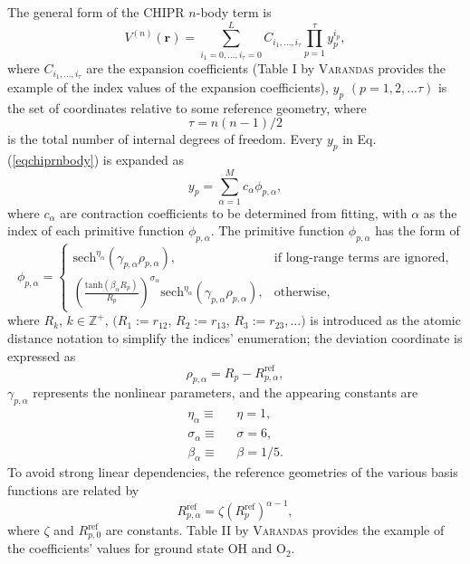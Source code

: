 \documentclass[12pt]{article}
\def\D{\displaystyle}
\begin{document}
The general form of the CHIPR $n$-body term is
\begin{equation}
    V^{(n)}(\mathbf{r}) = \sum^L_{i_1=0,...,i_\tau=0}C_{i_1,...,i_\tau}\prod^\tau_{p=1} y_p^{i_p},
\label{eqchiprnbody}
\end{equation}
where $C_{i_1,...,i_\tau}$ are the expansion coefficients (Table I by \textsc{Varandas} \cite{idx8} provides the example of the index values of the expansion coefficients), $y_p$ $(p=1,2,...\tau)$ is the set of coordinates relative to some reference geometry, where
\begin{equation}
    \tau = n(n-1)/2
\end{equation}
is the total number of internal degrees of freedom. Every $y_p$ in Eq.(\ref{eqchiprnbody}) is expanded as
\begin{equation}
    y_p = \sum^M_{\alpha=1}c_{\alpha}\phi_{p,\alpha},
\label{eqchiprcoor}
\end{equation}
where $c_\alpha$ are contraction coefficients to be determined from fitting, with $\alpha$ as the index of each primitive function 
$\phi_{p,\alpha}$. The primitive function $\phi_{p,\alpha}$ has the form of
\begin{equation}
    \phi_{p,\alpha} =
    \begin{cases}
        \text{sech}^{\eta_\alpha}(\gamma_{p,\alpha}\rho_{p,\alpha}),&\text{if long-range terms are ignored,} \\
        \D\left(\frac{\text{tanh}(\beta_\alpha R_p)}{R_p}\right)^{\D\sigma_\alpha}\text{sech}^{\eta_\alpha}(\gamma_{p,\alpha}\rho_{p,\alpha}),&\text{otherwise,}
    \end{cases}
\end{equation}
where $R_k$, $k \in \mathbb{Z}^+$, $(R_1:=r_{12}$, $R_2:=r_{13}$, $R_3:=r_{23}, ...)$ is introduced as the atomic distance notation to simplify the indices' enumeration; the deviation coordinate is expressed as
\begin{equation}
    \rho_{p,\alpha} = R_p - R^{\text{ref}}_{p,\alpha},
    \label{eq:chiprreference}
\end{equation}
$\gamma_{p,\alpha}$ represents the nonlinear parameters, and the appearing constants are
\begin{equation}
    \begin{split}
        \eta_\alpha \equiv \text{ } & \eta = 1,\\
        \sigma_\alpha \equiv \text{ } & \sigma = 6,\\
        \beta_\alpha \equiv \text{ } & \beta = 1/5.
    \end{split}
\end{equation}
To avoid strong linear dependencies, the reference geometries of the various basis functions are related by
\begin{equation}
    R^{\text{ref}}_{p,\alpha} = \zeta(R^{\text{ref}}_p)^{\alpha-1},
\end{equation}
where $\zeta$ and $R^{\text{ref}}_{p,0}$ are constants. Table II by \textsc{Varandas} \cite{idx8} provides the example of the coefficients' values for ground state OH and O$_2$.
\end{document}
